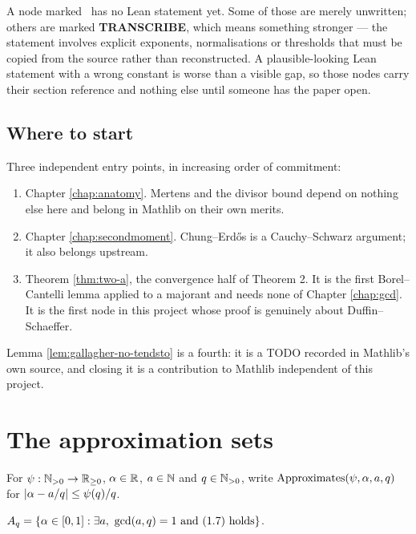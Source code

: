 A node marked \notready\ has no Lean statement yet. Some of those are merely unwritten;
others are marked \textbf{TRANSCRIBE}, which means something stronger --- the statement
involves explicit exponents, normalisations or thresholds that must be copied from the
source rather than reconstructed. A plausible-looking Lean statement with a wrong
constant is worse than a visible gap, so those nodes carry their section reference and
nothing else until someone has the paper open.

\section*{Where to start}

Three independent entry points, in increasing order of commitment:

\begin{enumerate}
  \item Chapter \ref{chap:anatomy}. Mertens and the divisor bound depend on nothing
    else here and belong in Mathlib on their own merits.
  \item Chapter \ref{chap:secondmoment}. Chung--Erd\H{o}s is a Cauchy--Schwarz
    argument; it also belongs upstream.
  \item Theorem \ref{thm:two-a}, the convergence half of Theorem 2. It is the first
    Borel--Cantelli lemma applied to a majorant and needs none of Chapter
    \ref{chap:gcd}. It is the first node in this project whose proof is genuinely
    about Duffin--Schaeffer.
\end{enumerate}

Lemma \ref{lem:gallagher-no-tendsto} is a fourth: it is a TODO recorded in Mathlib's
own source, and closing it is a contribution to Mathlib independent of this project.

\chapter{The approximation sets}
\label{chap:setup}

\begin{definition}[Inequality (1.7)]
  \label{def:approximates}
  \leanok
  For $\psi : \mathbb{N}_{>0} \to \mathbb{R}_{\geq 0}$, $\alpha \in \mathbb{R}$, $a \in \mathbb{N}$ and
  $q \in \mathbb{N}_{>0}$, write $\mathrm{Approximates}(\psi, \alpha, a, q)$ for
  $\left| \alpha - a/q \right| \leq \psi(q)/q$.
\end{definition}

\begin{definition}
  \label{def:setaq}
  \leanok
  $A_q = \{ \alpha \in [0,1] : \exists a,\ \gcd(a,q) = 1 \text{ and } (1.7) \text{ holds} \}$.
\end{definition}

